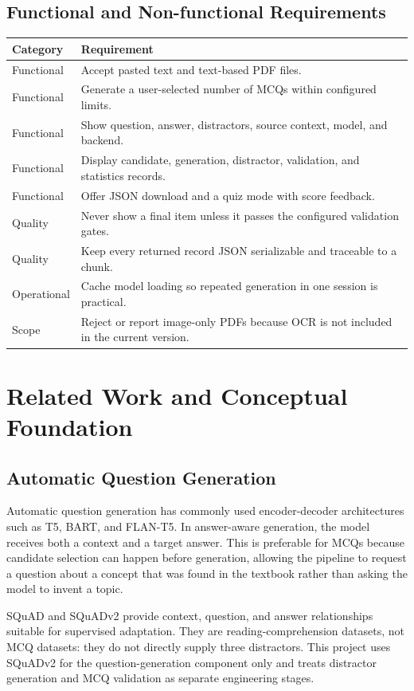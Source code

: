 \documentclass[12pt,a4paper]{report}
\begin{document}
\section{Functional and Non-functional Requirements}
\begin{longtable}{p{}p{}}
\toprule
\textbf{Category} & \textbf{Requirement}\\
\midrule
Functional & Accept pasted text and text-based PDF files.\\
Functional & Generate a user-selected number of MCQs within configured limits.\\
Functional & Show question, answer, distractors, source context, model, and backend.\\
Functional & Display candidate, generation, distractor, validation, and statistics records.\\
Functional & Offer JSON download and a quiz mode with score feedback.\\
Quality & Never show a final item unless it passes the configured validation gates.\\
Quality & Keep every returned record JSON serializable and traceable to a chunk.\\
Operational & Cache model loading so repeated generation in one session is practical.\\
Scope & Reject or report image-only PDFs because OCR is not included in the current version.\\
\bottomrule
\end{longtable}

\clearpage
\chapter{Related Work and Conceptual Foundation}
\section{Automatic Question Generation}
Automatic question generation has commonly used encoder-decoder architectures such as T5, BART, and FLAN-T5. In answer-aware generation, the model receives both a context and a target answer. This is preferable for MCQs because candidate selection can happen before generation, allowing the pipeline to request a question about a concept that was found in the textbook rather than asking the model to invent a topic.

SQuAD and SQuADv2 provide context, question, and answer relationships suitable for supervised adaptation. They are reading-comprehension datasets, not MCQ datasets: they do not directly supply three distractors. This project uses SQuADv2 for the question-generation component only and treats distractor generation and MCQ validation as separate engineering stages.
\end{document}
